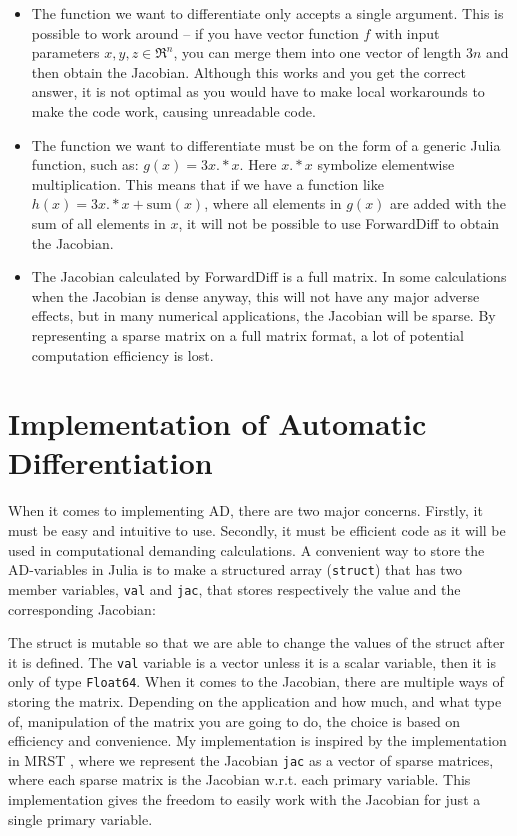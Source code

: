 \begin{itemize}
    \item The function we want to differentiate only accepts a single argument. This is possible to work around -- if you have vector function $f$ with input parameters $x,y,z \in \Re^n$, you can merge them into one vector of length $3n$ and then obtain the Jacobian. Although this works and you get the correct answer, it is not optimal as you would have to make local workarounds to make the code work, causing unreadable code.
    \item The function we want to differentiate must be on the form of a generic Julia function, such as: $g(x) = 3x.*x$. Here $x.*x$ symbolize elementwise multiplication. This means that if we have a function like $h(x) = 3x.*x + \text{sum}(x)$, where all elements in $g(x)$ are added with the sum of all elements in $x$, it will not be possible to use ForwardDiff to obtain the Jacobian.
    \item The Jacobian calculated by ForwardDiff is a full matrix. In some calculations when the Jacobian is dense anyway, this will not have any major adverse effects, but in many numerical applications, the Jacobian will be sparse. By representing a sparse matrix on a full matrix format, a lot of potential computation efficiency is lost.
\end{itemize}

\section{Implementation of Automatic Differentiation}
\label{sec:ImplementationAD}
When it comes to implementing AD, there are two major concerns. Firstly, it must be easy and intuitive to use. Secondly, it must be efficient code as it will be used in computational demanding calculations. A convenient way to store the AD-variables in Julia is to make a structured array (\texttt{struct}) that has two member variables, \texttt{val} and \texttt{jac}, that stores respectively the value and the corresponding Jacobian: 
 
The struct is mutable so that we are able to change the values of the struct after it is defined. The \texttt{val} variable is a vector unless it is a scalar variable, then it is only of type  \texttt{Float64}. When it comes to the Jacobian, there are multiple ways of storing the matrix. Depending on the application and how much, and what type of, manipulation of the matrix you are going to do, the choice is based on efficiency and convenience. My implementation is inspired by the implementation in MRST \emph{\citep{lieMrstUrl}}, where we represent the Jacobian \texttt{jac} as a vector of sparse matrices, where each sparse matrix is the Jacobian w.r.t. each primary variable. This implementation gives the freedom to easily work with the Jacobian for just a single primary variable.

